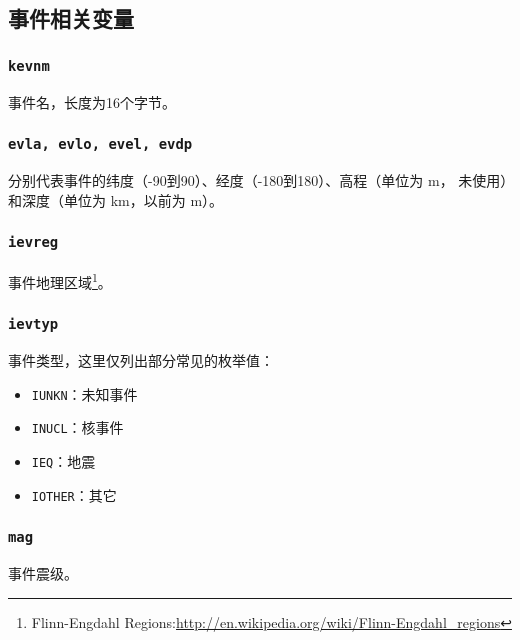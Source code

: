 \subsection{事件相关变量}
\subsubsection{\texttt{kevnm}}
事件名，长度为16个字节。

\subsubsection{\texttt{evla, evlo, evel, evdp}}
分别代表事件的纬度（-90到90）、经度（-180到180）、高程（单位为 \si{\m}，
未使用）和深度（单位为 \si{\km}，以前为 \si{\m}）。

\subsubsection{\texttt{ievreg}\dag}
事件地理区域\footnote{Flinn-Engdahl Regions:\url{http://en.wikipedia.org/wiki/Flinn-Engdahl_regions}}。

\subsubsection{\texttt{ievtyp}}
事件类型，这里仅列出部分常见的枚举值：
\begin{itemize}
\item \texttt{IUNKN}：未知事件
\item \texttt{INUCL}：核事件
\item \texttt{IEQ}：地震
\item \texttt{IOTHER}：其它
\end{itemize}

\subsubsection{\texttt{mag}}
事件震级。


